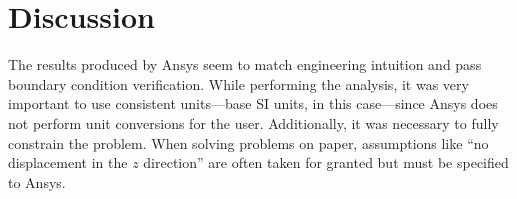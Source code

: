 \chapter{Discussion}\label{cp:discussion}

The results produced by Ansys seem to match engineering intuition and pass boundary condition verification. While performing the analysis, it was very important to use consistent units—base SI units, in this case—since Ansys does not perform unit conversions for the user. Additionally, it was necessary to fully constrain the problem. When solving problems on paper, assumptions like ``no displacement in the $z$ direction'' are often taken for granted but must be specified to Ansys.